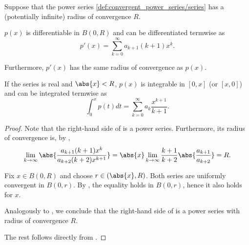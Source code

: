 \begin{theorem}\label{thm:series_termwise_operations}
  Suppose that the power series \eqref{def:convergent_power_series/series} has a (potentially infinite) radius of convergence \( R \).

  \begin{thmenum}
     \( p(x) \) is differentiable in \( B(0, R) \) and can be differentiated termwise as
    \begin{equation}\label{thm:series_termwise_operations/derivative}
      p'(x) = \sum_{k=0}^\infty a_{k+1} (k+1) x^k.
    \end{equation}

    Furthermore, \( p'(x) \) has the same radius of convergence as \( p(x) \).

     If the series is real and \( \abs{x} < R \), \( p(x) \) is integrable in \( [0, x] \) (or \( [x, 0] \)) and can be integrated termwise as
    \begin{equation}\label{thm:series_termwise_operations/primitive}
      \int_0^x p(t) dt = \sum_{k=0}^\infty a_k \frac {x^{k+1}} {k+1}.
    \end{equation}
  \end{thmenum}
\end{theorem}
\begin{proof}
   Note that the right-hand side of  is a power series. Furthermore, its radius of convergence is, by ,
  \begin{equation*}
    \lim_{k \to \infty} \abs{\frac {a_{k+1} (k+1) x^k} {a_{k+2} (k+2) x^{k+1}}}
    =
    \abs{x} \lim_{k \to \infty} \frac {k+1} {k+2} \abs{\frac {a_{k+1}} {a_{k+2}}}
    =
    R.
  \end{equation*}

  Fix \( x \in B(0, R) \) and choose \( r \in (\abs{x}, R) \). Both series are uniformly convergent in \( B(0, r) \). By , the equality  holds in \( B(0, r) \), hence it also holds for \( x \).

   Analogously to , we conclude that the right-hand side of  is a power series with radius of convergence \( R \).

  The rest follows directly from .
\end{proof}
